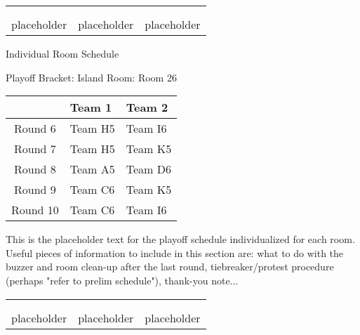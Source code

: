 \documentclass{article}%
\begin{document}
%
\begin{tabularx}{\textwidth}{YYY}%
  &  &  \\%
\\%
placeholder&placeholder&placeholder\\%
\end{tabularx}%
\newpage%
\begin{center}%
\begin{Huge}%
Individual Room Schedule%
\end{Huge}%
\vspace*{16pt}%
\linebreak%
\begin{Large}%
Playoff Bracket: Island \hfill Room: Room 26%
\end{Large}%
\end{center}%
%
\begin{tabularx}{\textwidth}{|c|Y|Y|}%
\hline%
&Team 1&Team 2\\%
\hline%
Round 6&Team H5&Team I6\\%
Round 7&Team H5&Team K5\\%
Round 8&Team A5&Team D6\\%
Round 9&Team C6&Team K5\\%
Round 10&Team C6&Team I6\\%
\hline%
\end{tabularx}%
\vspace*{16pt}%
\linebreak%
This is the placeholder text for the playoff schedule individualized for each room. Useful pieces of information to include in this section are: what to do with the buzzer and room clean{-}up after the last round, tiebreaker/protest procedure (perhaps "refer to prelim schedule"), thank{-}you note...%
\vspace*{30pt}%
\newline%
%
\begin{tabularx}{\textwidth}{YYY}%
  &  &  \\%
\\%
placeholder&placeholder&placeholder\\%
\end{tabularx}%
\end{document}
